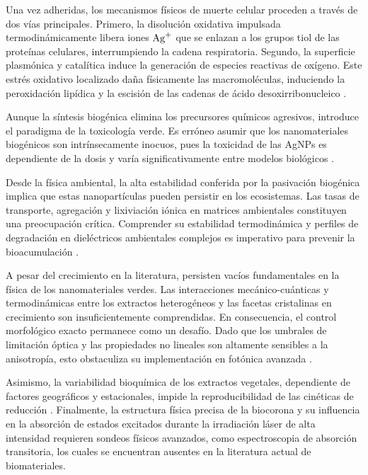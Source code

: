 Una vez adheridas, los mecanismos físicos de muerte celular proceden a través
de dos vías principales. Primero, la disolución oxidativa impulsada
termodinámicamente libera iones $\ce{Ag^+}$ que se enlazan a los grupos tiol de las
proteínas celulares, interrumpiendo la cadena respiratoria. Segundo, la
superficie plasmónica y catalítica induce la generación de especies reactivas
de oxígeno. Este estrés oxidativo localizado daña físicamente las
macromoléculas, induciendo la peroxidación lipídica y la escisión de las
cadenas de ácido desoxirribonucleico
\cite{thomasPlantbasedSynthesisCharacterization2024}.

Aunque la síntesis biogénica elimina los precursores químicos agresivos,
introduce el paradigma de la toxicología verde. Es erróneo asumir que los
nanomateriales biogénicos son intrínsecamente inocuos, pues la toxicidad de las
AgNPs es dependiente de la dosis y varía significativamente entre modelos
biológicos \cite{nogaToxicologicalAspectsSafety2023}.

Desde la física ambiental, la alta estabilidad conferida por la pasivación
biogénica implica que estas nanopartículas pueden persistir en los ecosistemas.
Las tasas de transporte, agregación y lixiviación iónica en matrices
ambientales constituyen una preocupación crítica. Comprender su estabilidad
termodinámica y perfiles de degradación en dieléctricos ambientales complejos
es imperativo para prevenir la bioacumulación
\cite{thomasPlantbasedSynthesisCharacterization2024,
nogaToxicologicalAspectsSafety2023}.

A pesar del crecimiento en la literatura, persisten vacíos fundamentales en la
física de los nanomateriales verdes. Las interacciones mecánico-cuánticas y
termodinámicas entre los extractos heterogéneos y las facetas cristalinas en
crecimiento son insuficientemente comprendidas. En consecuencia, el control
morfológico exacto permanece como un desafío. Dado que los umbrales de
limitación óptica y las propiedades no lineales son altamente sensibles a la
anisotropía, esto obstaculiza su implementación en fotónica avanzada
\cite{satiSilverNanoparticlesAgNPs2025}.

Asimismo, la variabilidad bioquímica de los extractos vegetales, dependiente de
factores geográficos y estacionales, impide la reproducibilidad de las
cinéticas de reducción \cite{hosnyComprehensiveReviewSilver2025}. Finalmente,
la estructura física precisa de la biocorona y su influencia en la absorción de
estados excitados durante la irradiación láser de alta intensidad requieren
sondeos físicos avanzados, como espectroscopia de absorción transitoria, los
cuales se encuentran ausentes en la literatura actual de biomateriales.

